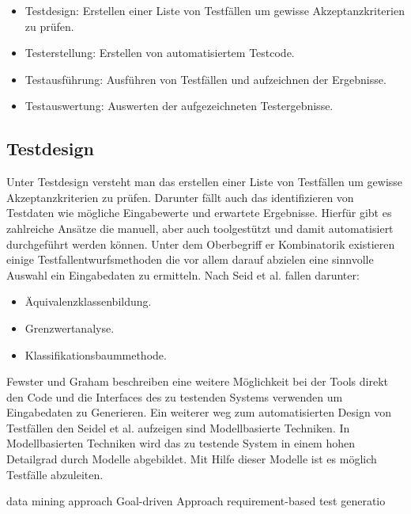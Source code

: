 \begin{itemize}
	  \itemsep0pt
      \item Testdesign: Erstellen einer Liste von Testfällen um gewisse Akzeptanzkriterien zu prüfen.
      \item Testerstellung: Erstellen von automatisiertem Testcode.
      \item Testausführung: Ausführen von Testfällen und aufzeichnen der Ergebnisse.
      \item Testauswertung: Auswerten der aufgezeichneten Testergebnisse.         
\end{itemize}

\subsection{Testdesign}
\label{subsec:testdesign}
Unter Testdesign versteht man das erstellen einer Liste von Testfällen um gewisse Akzeptanzkriterien zu prüfen. Darunter fällt auch das identifizieren von Testdaten wie mögliche Eingabewerte und erwartete Ergebnisse. Hierfür gibt es zahlreiche Ansätze die manuell, aber auch toolgestützt und damit automatisiert durchgeführt werden können.
Unter dem Oberbegriff er Kombinatorik existieren einige Testfallentwurfsmethoden die vor allem darauf abzielen eine sinnvolle Auswahl ein Eingabedaten zu ermitteln.
Nach Seid et al. fallen darunter: \cite[Seite 27]{seidl_basiswissen_2012}
\begin{itemize}
	  \itemsep0pt
      \item Äquivalenzklassenbildung.
      \item Grenzwertanalyse.
      \item Klassifikationsbaummethode.
\end{itemize}
Fewster und Graham \cite[Seite 19 ff.]{fewster_software_1999} beschreiben eine weitere Möglichkeit bei der Tools direkt den Code und die Interfaces des zu testenden Systems verwenden um Eingabedaten zu Generieren.
Ein weiterer weg zum automatisierten Design von Testfällen den Seidel et al. aufzeigen \cite[Seite 33]{seidl_basiswissen_2012} sind Modellbasierte Techniken. In Modellbasierten Techniken wird das zu testende System in einem hohen Detailgrad durch Modelle abgebildet. Mit Hilfe dieser Modelle ist es möglich Testfälle abzuleiten. 

data mining approach \cite{last_data_2003}
Goal-driven Approach \cite{memon_using_1999}
requirement-based test generatio \cite{tahat_requirement-based_2001}

